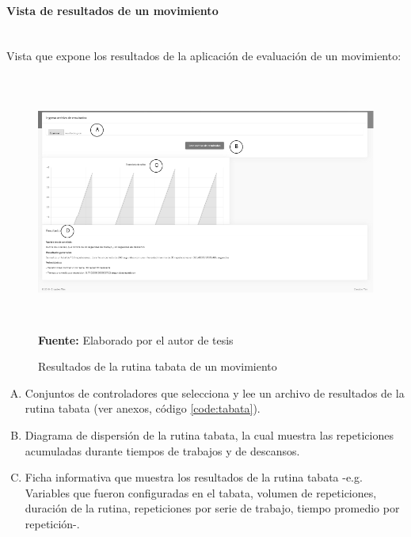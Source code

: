 \paragraph{Vista de resultados de un movimiento}\mbox{} \\ \label{ins:UI:web:result}
Vista que expone los resultados de la aplicaci\'on de evaluaci\'on de un movimiento:
\begin{figure}[H]
	\caption{Resultados de la rutina tabata de un movimiento}
	\label{fig:resultsTabata}
	\centering
	\includegraphics[width=460px,height=320px]{graphics/web-results.PNG} \\
	\textbf{Fuente:} Elaborado por el autor de tesis
\end{figure}
\begin{enumerate}[A.]
\item Conjuntos de controladores que selecciona y lee un archivo de resultados de la rutina tabata (ver anexos, c\'odigo \ref{code:tabata}).
\item Diagrama de dispersi\'on de la rutina tabata, la cual muestra las repeticiones acumuladas durante tiempos de trabajos y de descansos.
\item Ficha informativa que muestra los resultados de la rutina tabata -e.g. Variables que fueron configuradas en el tabata, volumen de repeticiones, duraci\'on de la rutina, repeticiones por serie de trabajo, tiempo promedio por repetici\'on-.
\end{enumerate}
